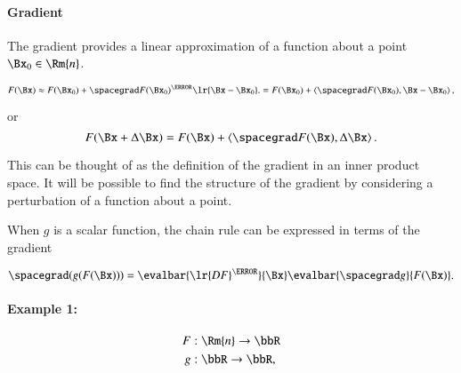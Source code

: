 
\paragraph{Gradient}

The gradient provides a linear approximation of a function about a point \( \Bx_0 \in \Rm{n} \).

\begin{dmath}\label{eqn:jacobianAndHessian:484}
F(\Bx)
\approx F(\Bx_0) + \spacegrad F(\Bx_0)^\T \lr{ \Bx - \Bx_0 }.
=
F(\Bx_0) + \innerproduct{ \spacegrad F(\Bx_0)}{ \Bx - \Bx_0 },
\end{dmath}

or
\begin{equation}\label{eqn:jacobianAndHessian:504}
F(\Bx + \Delta \Bx)
=
F(\Bx) + \innerproduct{ \spacegrad F(\Bx)}{ \Delta \Bx }.
\end{equation}

This can be thought of as the definition of the gradient in an inner product space.  It will be possible to find the structure of the gradient by considering a perturbation of a function about a point.

When \( g \) is a scalar function, the chain rule can be expressed in terms of the gradient

\begin{dmath}\label{eqn:jacobianAndHessian:724}
\spacegrad
(g(F(\Bx)))
=
\evalbar{\lr{
D F
}^\T}{\Bx}
\evalbar{\spacegrad g}{F(\Bx)}.
\end{dmath}


\paragraph{Example 1:}

\begin{dmath}\label{eqn:jacobianAndHessian:524}
\begin{aligned}
F &: \Rm{n} \rightarrow \bbR \\
g &: \bbR \rightarrow \bbR,
\end{aligned}
\end{dmath}


